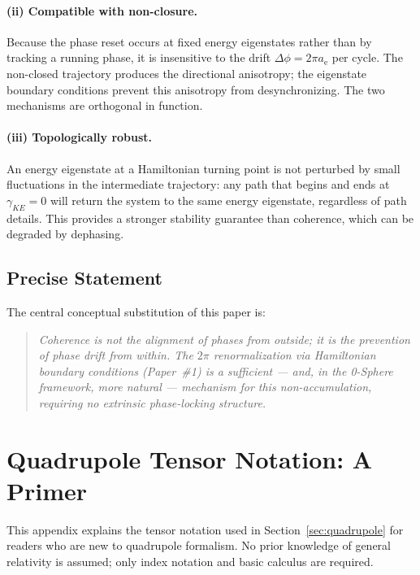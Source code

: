 \documentclass[%
 reprint, amsmath,amssymb, aps, prb, ]{revtex4-2}
\numberwithin{equation}{section}
\newcommand{\anom}{a_{\mathrm{e}}}
\begin{document}
\paragraph{(ii) Compatible with non-closure.}
Because the phase reset occurs at fixed energy eigenstates rather than by tracking a running phase, it is insensitive to the drift $\Delta\phi = 2\pi\anom$ per cycle.
The non-closed trajectory produces the directional anisotropy; the eigenstate boundary conditions prevent this anisotropy from desynchronizing.
The two mechanisms are orthogonal in function.

\paragraph{(iii) Topologically robust.}
An energy eigenstate at a Hamiltonian turning point is not perturbed by small fluctuations in the intermediate trajectory: any path that begins and ends at $\gamma_{KE} = 0$ will return the system to the same energy eigenstate, regardless of path details.
This provides a stronger stability guarantee than coherence, which can be degraded by dephasing.

\subsection{Precise Statement}

The central conceptual substitution of this paper is:
\begin{quote}
\emph{Coherence is not the alignment of phases from outside; it is the prevention of phase drift from within. The $2\pi$ renormalization via Hamiltonian boundary conditions (Paper~\#1) is a sufficient --- and, in the 0-Sphere framework, more natural --- mechanism for this non-accumulation, requiring no extrinsic phase-locking structure.}
\end{quote}

\section{Quadrupole Tensor Notation: A Primer}
\label{app:notation}

This appendix explains the tensor notation used in Section~\ref{sec:quadrupole} for readers who are new to quadrupole formalism.
No prior knowledge of general relativity is assumed; only index notation and basic calculus are required.
\end{document}
